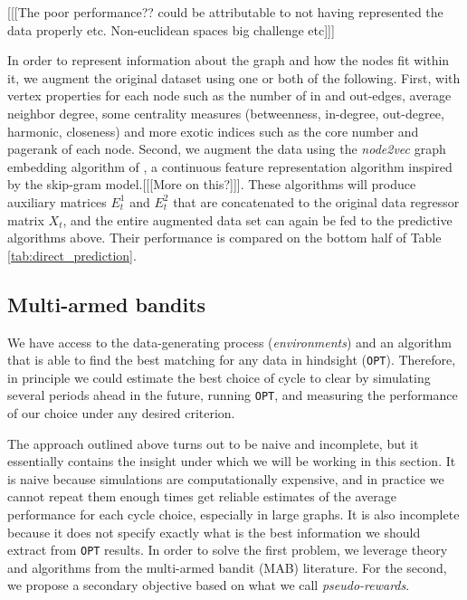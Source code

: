 \documentclass[12pt]{article}
\begin{document}
[[[The poor performance?? could be attributable to not having represented the data properly etc. Non-euclidean spaces big challenge etc]]]

 In order to represent information about the graph and how the nodes fit within it, we augment the original dataset using one or both of the following. First, with vertex properties for each node such as the number of in and out-edges, average neighbor degree, some centrality measures (betweenness, in-degree, out-degree, harmonic, closeness) and more exotic indices such as the core number and pagerank of each node\cite{newman2010networks}. Second, we augment the data using the \emph{node2vec} graph embedding algorithm of \cite{grover2016node2vec}, a continuous feature representation algorithm inspired by the skip-gram model.[[[More on this?]]]. These algorithms will produce auxiliary matrices $E_t^{1}$ and $E_t^2$ that are concatenated to the original data regressor matrix $X_t$, and the entire augmented data set can again be fed to the predictive algorithms above. Their performance is compared on the bottom half of Table \ref{tab:direct_prediction}.
 

 
 
\subsection{Multi-armed bandits}
 
We have access to the data-generating process (\emph{environments}) and an algorithm that is able to find the best matching for any data in hindsight (\texttt{OPT}). Therefore, in principle we could estimate the best choice of cycle to clear by simulating several periods ahead in the future, running \texttt{OPT}, and measuring the performance of our choice under any desired criterion. 

The approach outlined above turns out to be naive and incomplete, but it essentially contains the insight under which we will be working in this section. It is naive because simulations are computationally expensive, and in practice we cannot repeat them enough times get reliable estimates of the average performance for each cycle choice, especially in large graphs. It is also incomplete because it does not specify exactly what is the best information we should extract from \texttt{OPT} results. In order to solve the first problem, we leverage theory and algorithms from the multi-armed bandit (MAB) literature. For the second, we propose a secondary objective based on what we call \emph{pseudo-rewards}.
\end{document}
